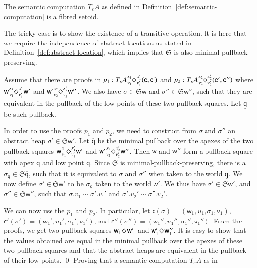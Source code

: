 \documentclass[orivec]{llncs}
\newif\iffull\fullfalse
\newcommand{\sq}[4]{\tensor*[^{#1}_{#2}]{\Diamond}{^{#3}_{#4}}}
\newcommand{\eff}{\varepsilon}
\renewenvironment{proof}{\vspace{-1mm} \noindent {\bf Proof}\quad}{\qed}
\newcommand\w{\ensuremath{\mathsf{w}}\xspace}
\newcommand\q{\ensuremath{\mathsf{q}}\xspace}
\newcommand{\Astores}{\mathfrak{S}}
\newcommand\val{\ensuremath{\mathsf{v}}\xspace}
\newcommand\cval{\ensuremath{\mathsf{c}}\xspace}
\begin{document}
\iffull
\begin{proposition}
The semantic computation $T_\eff A$ as defined in
Definition~\ref{def:semantic-computation} is a fibred setoid.
\end{proposition}
\begin{proof}
  The tricky case is to show the existence of a transitive operation.
  It is here that we require the independence of abstract locations as
  stated in Definition~\ref{def:abstract-location}, which implies that
  $\Astores$ is also minimal-pullback-preserving.

Assume that there are proofs in $p_1 : T_\eff A \sq{x_1}{v_1}{x_1'}{v_1'}
(\cval, \cval')$ and $p_2 : T_\eff A \sq{x_2}{v_2}{x_2'}{v_2'} (\cval',
\cval'')$ where 
$\w \sq{x_1}{v_1}{x_1'}{v_1'} \w'$ and $\w' \sq{x_2}{v_2}{x_2'}{v_2'}
\w''$. We also have $\sigma \in \Astores \w$ and $\sigma'' \in \Astores
\w''$, such that they are equivalent in the pullback of
the low points of these two pullback squares. Let $\underline{\q}$ be such
pullback. 

In order to use the proofs $p_1$ and $p_2$, we need to construct
from $\sigma$ and $\sigma''$ an abstract heap $\sigma' \in \Astores\w'$.
Let $\overline{\q}$ be the minimal pullback over the apexes of the two pullback
squares $\w \sq{x_1}{v_1}{x_1'}{v_1'} \w'$ and $\w'
\sq{x_2}{v_2}{x_2'}{v_2'} \w''$. Then $\w$ and $\w''$ form a pullback
square with apex $\overline{\q}$ and low point $\underline{\q}$. Since
$\Astores$ is minimal-pullback-preserving, there is a $\sigma_{\q} \in \Astores
\overline{\q}$, such that it is equivalent to $\sigma$ and $\sigma''$ when
taken to the world $\underline{\q}$. We now define $\sigma' \in \Astores
\w'$ to be $\sigma_{\q}$ taken to the world $\w'$. We thus have $\sigma'
\in \Astores
\w'$, and $\sigma'' \in \Astores \w''$, such that $\sigma.v_1 \sim
\sigma'.v_1'$ and $\sigma'.v_2' \sim \sigma''.v_2'$.

We can now use the $p_1$ and $p_2$. In particular, 
let $\cval(\sigma) = (\w_1, u_1, \sigma_1, \val_1)$, $\cval'(\sigma') =
(\w_1', u_1', \sigma_1', \val_1')$, and $\cval''(\sigma'') = (\w_1'',
u_1'', \sigma_1'', \val_1'')$. From the proofs, we get two
pullback squares $\w_1\sq{}{}{}{}\w_1'$ and $\w_1'\sq{}{}{}{}\w_1''$. It
is easy to show that the values obtained are equal in the minimal pullback over 
the
apexes of these two pullback squares and that the abstract heaps are
equivalent in the pullback of their low points.
\end{proof} 
\else
Proving that a semantic computation $T_\eff A$ as  in
\end{document}
